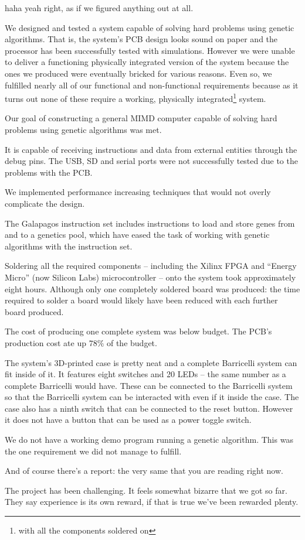 haha yeah right, as if we figured anything out at all.




We designed and tested a system capable of solving hard problems using genetic algorithms.
That is, the system's PCB design looks sound on paper and the processor has been successfully tested with simulations.
However we were unable to deliver a functioning physically integrated version of the system because the ones we produced were eventually bricked for various reasons.
Even so, we fulfilled nearly all of our functional and non-functional requirements because as it turns out none of these require a working, physically integrated\footnote{with all the components soldered on} system.

Our goal of constructing a general MIMD computer capable of solving hard problems using genetic algorithms was met.

It is capable of receiving instructions and data from external entities through the debug pins.
The USB, SD and serial ports were not successfully tested due to the problems with the PCB.

We implemented performance increasing techniques that would not overly complicate the design.

The Galapagos instruction set includes instructions to load and store genes from and to a genetics pool, which have eased the task of working with genetic algorithms with the instruction set.


Soldering all the required components -- including the Xilinx FPGA and ``Energy Micro'' (now Silicon Labs) microcontroller --  onto the system took approximately eight hours.
Although only one completely soldered board was produced: the time required to solder a board would likely have been reduced with each further board produced.

The cost of producing one complete system was below budget.
The PCB's production cost ate up $78\%$ of the budget.

The system's 3D-printed case is pretty neat and a complete Barricelli system can fit inside of it. 
It features eight switches and 20 LEDs -- the same number as a complete Barricelli would have.
These can be connected to the Barricelli system so that the Barricelli system can be interacted with even if it inside the case.
The case also has a ninth switch that can be connected to the reset button.
However it does not have a button that can be used as a power toggle switch.

We do not have a working demo program running a genetic algorithm.
This was the one requirement we did not manage to fulfill.

And of course there's a report: the very same that you are reading right now.

The project has been challenging.
It feels somewhat bizarre that we got so far.
They say experience is its own reward, if that is true we've been rewarded plenty.

